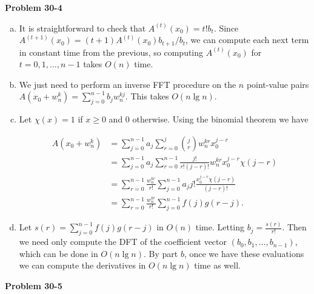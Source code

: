 \documentclass{article}
\begin{document}
\noindent\textbf{Problem 30-4}\\

\begin{enumerate}[a.]

\item  It is straightforward to check that $A^{(t)}(x_0) = t!b_t$.  Since $A^{(t+1)}(x_0) = (t+1)A^{(t)}(x_0)b_{t+1}/b_t$, we can compute each next term in constant time from the previous, so computing $A^{(t)}(x_0)$ for $t=0,1,\ldots,n-1$ takes $O(n)$ time. 

\item We just need to perform an inverse FFT procedure on the $n$ point-value pairs $A(x_0 + w_n^k) = \sum_{j=0}^{n-1}b_jw_n^{kj}$. This takes $O(n \lg n)$. 

\item Let $\chi(x) = 1$ if $x \geq 0$ and 0 otherwise.  Using the binomial theorem we have

\begin{align*}
A(x_0 + w_n^k) &= \sum_{j=0}^{n-1} a_j\sum_{r=0}^j {j \choose r} w_n^{kr}x_0^{j-r} \\
&=  \sum_{j=0}^{n-1} a_j\sum_{r=0}^{n-1} \frac{j!}{r!(j-r)!} w_n^{kr}x_0^{j-r} \chi(j-r) \\
&= \sum_{r=0}^{n-1}\frac{w_n^{kr}}{r!} \sum_{j=0}^{n-1}a_j j! \frac{x_0^{j-r} \chi(j-r)}{(j-r)!} \\
&=  \sum_{r=0}^{n-1}\frac{w_n^{kr}}{r!} \sum_{j=0}^{n-1} f(j)g(r-j).
\end{align*}

\item Let $s(r) = \sum_{j=0}^{n-1} f(j)g(r-j)$ in $O(n)$ time. Letting $b_j = \frac{s(r)}{ r!}$.  Then we need only compute the DFT of the coefficient vector $(b_0,b_1,\ldots, b_{n-1})$, which can be done in $O(n\lg n)$. By part $b$, once we have these evaluations we can compute the derivatives in $O(n \lg n)$ time as well.

\end{enumerate}

\noindent\textbf{Problem 30-5}\\
\end{document}
